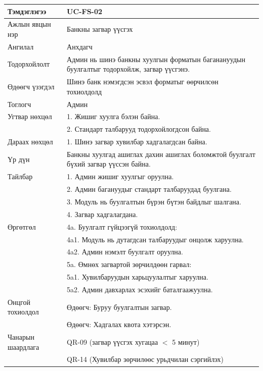 \begin{longtable}{|L{4cm}|L{\dimexpr\textwidth-4cm-3\arrayrulewidth\relax}|}
Тэмдэглэгээ & UC-FS-02 \\ \hline
Ажлын явцын нэр & Банкны загвар үүсгэх \\ \hline
Ангилал & Анхдагч \\ \hline
Тодорхойлолт & Админ нь шинэ банкны хуулгын форматын баганануудын буулгалтыг тодорхойлж, загвар үүсгэнэ. \\ \hline
Өдөөгч үзэгдэл & Шинэ банк нэмэгдсэн эсвэл форматыг өөрчилсөн тохиолдолд \\ \hline
Тоглогч & Админ \\ \hline
Угтвар нөхцөл & 1. Жишиг хуулга бэлэн байна.\\
               & 2. Стандарт талбарууд тодорхойлогдсон байна. \\ \hline
Дараах нөхцөл & 1. Шинэ загвар хувилбар хадгалагдсан байна.\\ \hline
Үр дүн & Банкны хуулгад ашиглах дахин ашиглах боломжтой буулгалт бүхий загвар үүссэн байна. \\ \hline
Тайлбар & 1. Админ жишиг хуулгыг оруулна.\\
              & 2. Админ багануудыг стандарт талбаруудад буулгана.\\
              & 3. Модуль нь буулгалтын бүрэн бүтэн байдлыг шалгана.\\
              & 4. Загвар хадгалагдана.\\ \hline
Өргөтгөл & 4a. Буулгалт гүйцээгүй тохиолдолд: \\
                      & \quad 4a1. Модуль нь дутагдсан талбаруудыг онцолж харуулна. \\
                      & \quad 4a2. Админ нэмэлт буулгалт оруулна. \\[4pt]
                      & 5a. Өмнөх загвартой зөрчилдөөн гарвал: \\
                      & \quad 5a1. Хувилбаруудын харьцуулалтыг харуулна. \\
                      & \quad 5a2. Админ давхарлах эсэхийг баталгаажуулна. \\ \hline
Онцгой тохиолдол & Өдөөгч: Буруу буулгалтын загвар.\\
                    & Өдөөгч: Хадгалах квота хэтэрсэн. \\ \hline
Чанарын шаардлага & QR-09 (загвар үүсгэх хугацаа $<$ 5 минут)\\
          & QR-14 (Хувилбар зөрчилөөс урьдчилан сэргийлэх)\\ \hline

\end{longtable}


